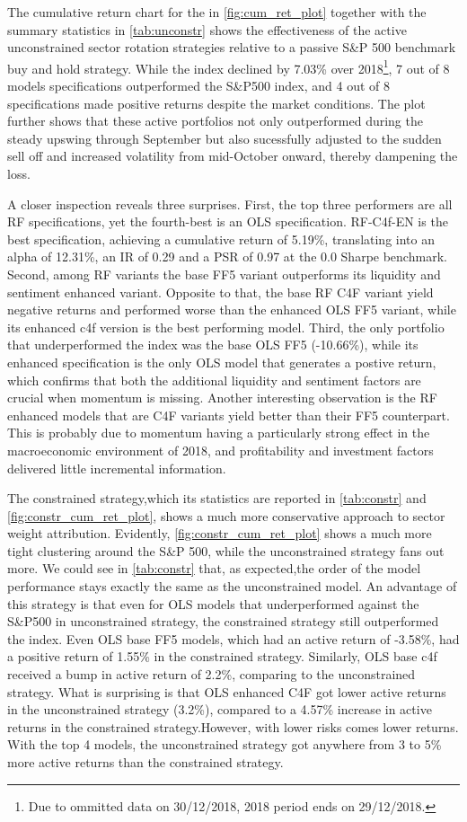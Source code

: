 The cumulative return chart for the in \cref{fig:cum_ret_plot} together with the summary statistics in \cref{tab:unconstr} shows the effectiveness of the active unconstrained sector rotation strategies relative to a passive S\&P 500 benchmark buy and hold strategy. While the index declined by 7.03\% over 2018\footnote{Due to ommitted data on 30/12/2018, 2018 period ends on 29/12/2018.}, 7 out of 8 models specifications outperformed the S\&P500 index, and 4 out of 8 specifications made positive returns despite the market conditions. The plot further shows that these active portfolios not only outperformed during the steady upswing through September but also sucessfully adjusted to the sudden sell off and increased volatility from mid-October onward, thereby dampening the loss.

A closer inspection reveals three surprises. First, the top three performers are all RF specifications, yet the fourth-best is an OLS specification. RF-C4f-EN is the best specification, achieving a cumulative return of 5.19\%, translating into an alpha of 12.31\%, an IR of 0.29 and a PSR of 0.97 at the 0.0 Sharpe benchmark.  Second, among RF variants the base FF5 variant outperforms its liquidity and sentiment enhanced variant. Opposite to that, the base RF C4F variant yield negative returns and performed worse than the enhanced OLS FF5 variant, while its enhanced c4f version is the best performing model. Third,  the only portfolio that underperformed the index was the base OLS FF5 (-10.66\%), while its enhanced specification is the only OLS model that generates a postive return, which confirms that both the additional liquidity and sentiment factors are crucial when momentum is missing. Another interesting observation is the RF enhanced models that are C4F variants yield better than their FF5 counterpart. This is probably due to momentum having a particularly strong effect in the macroeconomic environment of 2018, and profitability and investment factors delivered little incremental information.

The constrained strategy,which its statistics are reported in \cref{tab:constr} and \cref{fig:constr_cum_ret_plot}, shows a much more conservative approach to sector weight attribution. Evidently, \cref{fig:constr_cum_ret_plot} shows a much more tight clustering around the S\&P 500, while the unconstrained strategy fans out more. We could see in \cref{tab:constr} that, as expected,the order of the model performance stays exactly the same as the unconstrained model. An advantage of this strategy is that even for OLS models that underperformed against the S\&P500 in unconstrained strategy, the constrained strategy still outperformed the index. Even OLS base FF5 models, which had an active return of -3.58\%, had a positive return of 1.55\% in the constrained strategy. Similarly, OLS base c4f received a bump in active return of 2.2\%, comparing to the unconstrained strategy. What is surprising is that OLS enhanced C4F got lower active returns in the unconstrained strategy (3.2\%), compared to a 4.57\% increase in active returns in the constrained strategy.However, with lower risks comes lower returns. With the top 4 models, the unconstrained strategy got anywhere from 3 to 5\% more active returns than the constrained strategy.

